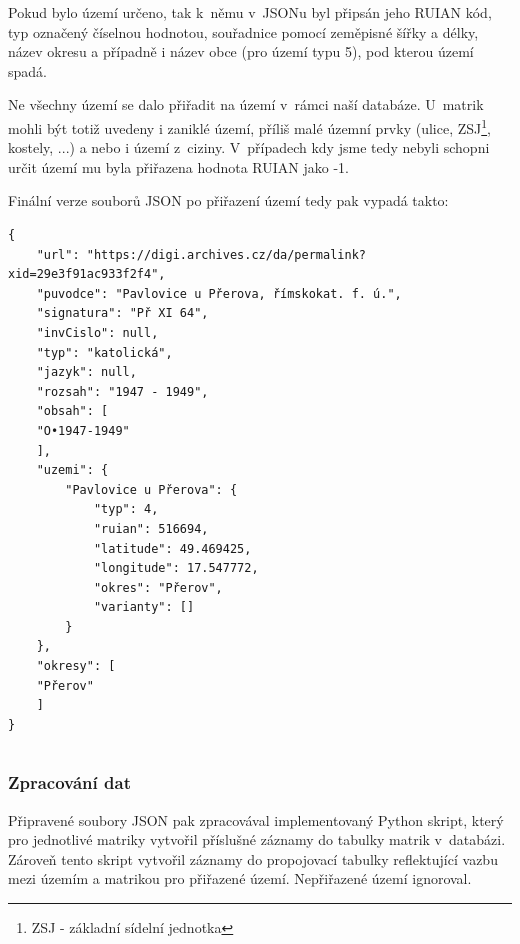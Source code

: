 Pokud bylo území určeno, tak k~němu v~JSONu byl připsán jeho RUIAN kód, typ označený číselnou hodnotou, souřadnice pomocí zeměpisné šířky a délky, název okresu a případně i název obce (pro území typu 5), pod kterou území spadá.

Ne všechny území se dalo přiřadit na území v~rámci naší databáze. U~matrik mohli být totiž uvedeny i zaniklé území, příliš malé územní prvky (ulice, ZSJ\footnote{ZSJ - základní sídelní jednotka}, kostely, ...) a nebo i území z~ciziny. V~případech kdy jsme tedy nebyli schopni určit území mu byla přiřazena hodnota RUIAN jako -1.

Finální verze souborů JSON po přiřazení území tedy pak vypadá takto:

\begin{small}
\begin{verbatim}
{
    "url": "https://digi.archives.cz/da/permalink?xid=29e3f91ac933f2f4",
    "puvodce": "Pavlovice u Přerova, římskokat. f. ú.",
    "signatura": "Př XI 64",
    "invCislo": null,
    "typ": "katolická",
    "jazyk": null,
    "rozsah": "1947 - 1949",
    "obsah": [
    "O•1947-1949"
    ],
    "uzemi": {
        "Pavlovice u Přerova": {
            "typ": 4,
            "ruian": 516694,
            "latitude": 49.469425,
            "longitude": 17.547772,
            "okres": "Přerov",
            "varianty": []
        }
    },
    "okresy": [
    "Přerov"
    ]
}
\end{verbatim}
\end{small}
\begin{lstlisting}[caption={Ukázka zpracované matriky ve formátu JSON z~Opavského archivu. Jedná se o~matriku oddaných v~rozmezí let 1947 až 1949. Tato matrika pokrývá jediné území, Pavlovice u~Přerova, obec v~okrese Přerov.},captionpos=b]
\end{lstlisting}

\subsubsection{Zpracování dat}
Připravené soubory JSON pak zpracovával implementovaný Python skript, který pro jednotlivé matriky vytvořil příslušné záznamy do tabulky matrik v~databázi. Zároveň tento skript vytvořil záznamy do propojovací tabulky reflektující vazbu mezi územím a matrikou pro přiřazené území. Nepřiřazené území ignoroval.
